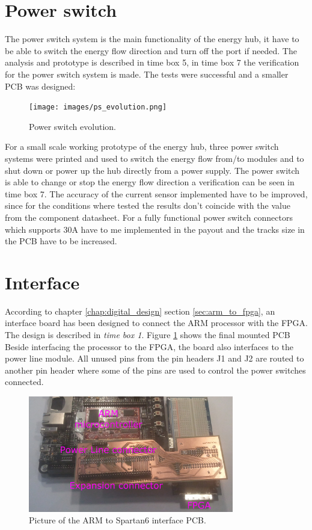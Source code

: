 \section{Power switch}
The power switch system is the main functionality of the energy hub, it have to be able to switch the energy flow direction and turn off the port if needed. The analysis and prototype is described in time box 5, in time box 7 the verification for the power switch system is made.
\p
The tests were successful and a smaller PCB was designed:
\begin{figure}[H]
	\begin{centering}
		\texttt{[image: images/ps\_evolution.png]}
		\caption{Power switch evolution.}
	\end{centering}
\end{figure}

For a small scale working prototype of the energy hub, three power switch systems were printed and used to switch the energy flow from/to modules and to shut down or power up the hub directly from a power supply.
\p
The power switch is able to change or stop the energy flow direction a verification can be seen in time box 7. The accuracy of the current sensor implemented have to be improved, since for the conditions where tested the results don't coincide with the value from the component datasheet. For a fully functional power switch connectors which supports 30A have to me implemented in the payout and the tracks size in the PCB have to be increased.
%

\section{Interface}
According to chapter \ref{chap:digital_design} section \ref{sec:arm_to_fpga}, an interface board has been designed to connect the ARM processor with the FPGA. 
The design is described in \textit{time box 1}. Figure \ref{fig:arm2fpga_interface} shows the final mounted PCB
\p Beside interfacing the processor to the FPGA, the board also interfaces to the power line module. 
\p All unused pins from the pin headers J1 and J2 are routed to another pin header where some of the pins are used to control the power switches connected.
 
\begin{figure}[H]
	\begin{centering}
		 \includegraphics[width=0.80\textwidth]{images/hw_interface_photo_v0_2.jpg}
		\caption{Picture of the ARM to Spartan6 interface PCB.}
		\label{fig:arm2fpga_interface}
	\end{centering}
\end{figure}
